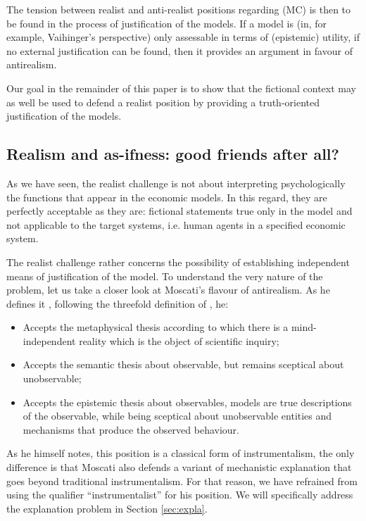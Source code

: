 \documentclass[a4paper,11pt]{article}
\theoremstyle{definition}
\begin{document}
The tension between realist and anti-realist positions regarding (MC) is then to be found in the process of justification of the models. If a model is (in, for example, Vaihinger's perspective) only assessable in terms of (epistemic) utility, if no external justification can be found, then it provides an argument in favour of antirealism.

Our goal in the remainder of this paper is to show that the fictional context may as well be used to defend a realist position by providing a truth-oriented justification of the models.


\subsection{Realism and as-ifness: good friends after all?}

As we have seen, the realist challenge is not about interpreting psychologically the functions that appear in the economic models. In this regard, they are perfectly acceptable as they are: fictional statements true only in the model and not applicable to the target systems, i.e. human agents in a specified economic system.

The realist challenge rather concerns the possibility of establishing independent means of justification of the model. To understand the very nature of the problem, let us take a closer look at Moscati's flavour of antirealism. As he defines it \citep[pp.~18-20]{Moscati2023}, following the threefold definition of \citep{Psillos1999}, he:

\begin{itemize}
    \item Accepts the metaphysical thesis according to which there is a mind-independent reality which is the object of scientific inquiry;
    \item Accepts the semantic thesis about observable, but remains sceptical about unobservable;
    \item Accepts the epistemic thesis about observables, models are true descriptions of the observable, while being sceptical about unobservable entities and mechanisms that produce the observed behaviour.
\end{itemize}

As he himself notes, this position is a classical form of instrumentalism, the only difference is that Moscati also defends a variant of mechanistic explanation that goes beyond traditional instrumentalism. For that reason, we have refrained from using the qualifier ``instrumentalist'' for his position. We will specifically address the explanation problem in Section \ref{sec:expla}.
\end{document}
